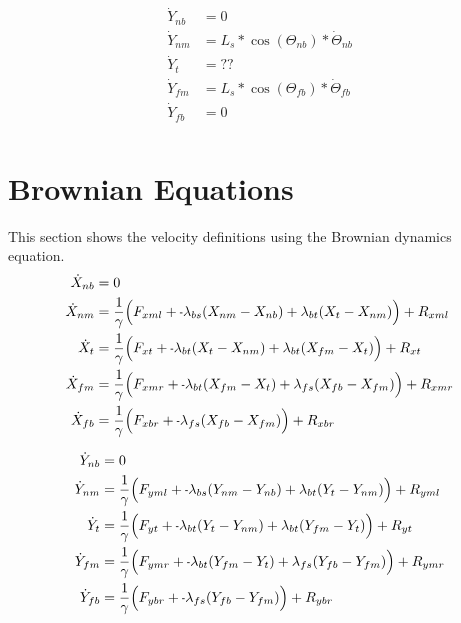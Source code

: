 \documentclass[11pt, landscape]{article}
\newcommand{\mn}{\scalebox{0.7}[1.0]{-}}
\begin{document}
\begin{align}                                                                          
  \dot{Y}_{nb} &= 0 \\                                         
  \dot{Y}_{nm} &= L_{s}*\cos(\Theta_{nb})*\dot{\Theta}_{nb} \\
  \dot{Y}_{t}  &= ?? \\
  \dot{Y}_{fm} &= L_{s}*\cos(\Theta_{fb})*\dot{\Theta}_{fb} \\
  \dot{Y}_{fb} &= 0 \\
\end{align}

\section{Brownian Equations}
This section shows the velocity definitions using the Brownian dynamics equation. \\
\begin{align}  
  \dot{X}_{nb} &= 0 \\
  \dot{X}_{nm} &= \frac{1}{\gamma} \Big(F_{xml} + \mn \lambda_{bs}(X_{nm} - X_{nb}) + \lambda_{bt}(X_{t } - X_{nm}) \Big) + R_{xml} \\
  \dot{X}_{t } &= \frac{1}{\gamma} \Big(F_{xt } + \mn \lambda_{bt}(X_{t } - X_{nm}) + \lambda_{bt}(X_{fm} - X_{t }) \Big) + R_{xt } \\
  \dot{X}_{fm} &= \frac{1}{\gamma} \Big(F_{xmr} + \mn \lambda_{bt}(X_{fm} - X_{t }) + \lambda_{fs}(X_{fb} - X_{fm}) \Big) + R_{xmr} \\
  \dot{X}_{fb} &= \frac{1}{\gamma} \Big(F_{xbr} + \mn \lambda_{fs}(X_{fb} - X_{fm})                                 \Big) + R_{xbr}
\end{align}

\begin{align}  
  \dot{Y}_{nb} &= 0 \\
  \dot{Y}_{nm} &= \frac{1}{\gamma} \Big(F_{yml} + \mn \lambda_{bs}(Y_{nm} - Y_{nb}) + \lambda_{bt}(Y_{t } - Y_{nm}) \Big) + R_{yml} \\
  \dot{Y}_{t}  &= \frac{1}{\gamma} \Big(F_{yt } + \mn \lambda_{bt}(Y_{t } - Y_{nm}) + \lambda_{bt}(Y_{fm} - Y_{t }) \Big) + R_{yt } \\
  \dot{Y}_{fm} &= \frac{1}{\gamma} \Big(F_{ymr} + \mn \lambda_{bt}(Y_{fm} - Y_{t }) + \lambda_{fs}(Y_{fb} - Y_{fm}) \Big) + R_{ymr} \\
  \dot{Y}_{fb} &= \frac{1}{\gamma} \Big(F_{ybr} + \mn \lambda_{fs}(Y_{fb} - Y_{fm})                                 \Big) + R_{ybr}
\end{align}
  
\end{document}
